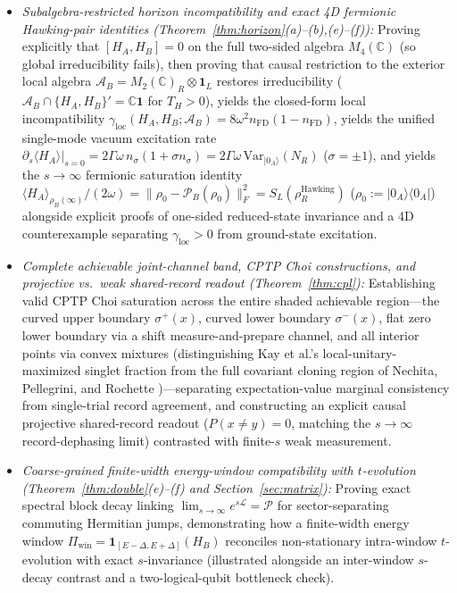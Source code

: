\documentclass[11pt,a4paper]{article}
\theoremstyle{definition}
\theoremstyle{remark}
\newcommand{\cA}{\mathcal{A}}
\newcommand{\cL}{\mathcal{L}}
\newcommand{\cP}{\mathcal{P}}
\newcommand{\bbC}{\mathbb{C}}
\newcommand{\1}{\mathbf{1}}
\newcommand{\normF}[1]{\|#1\|_F}
\begin{document}
\begin{enumerate}
\begin{itemize}
    \item \emph{Subalgebra-restricted horizon incompatibility and exact 4D fermionic Hawking-pair identities (Theorem~\ref{thm:horizon}(a)--(b),(e)--(f)):} Proving explicitly that $[H_A,H_B]=0$ on the full two-sided algebra $M_4(\bbC)$ (so global irreducibility fails), then proving that causal restriction to the exterior local algebra $\cA_B = M_2(\bbC)_R\otimes\1_L$ restores irreducibility ($\cA_B\cap\{H_A,H_B\}'=\bbC\1$ for $T_H>0$), yields the closed-form local incompatibility $\gamma_{\mathrm{loc}}(H_A,H_B;\cA_B) = \allowbreak 8\omega^2 n_{\mathrm{FD}}(1-n_{\mathrm{FD}})$, yields the unified single-mode vacuum excitation rate $\partial_s\langle H_A\rangle|_{s=0} = \allowbreak 2\Gamma\omega\,n_\sigma(1+\sigma n_\sigma) = \allowbreak 2\Gamma\omega\,\mathrm{Var}_{|0_A\rangle}(N_R)$ ($\sigma=\pm 1$), and yields the $s\to\infty$ fermionic saturation identity $\langle H_A\rangle_{\rho_B(\infty)}/(2\omega) = \allowbreak \normF{\rho_0 - \cP_B(\rho_0)}^2 = \allowbreak S_L(\rho_R^{\mathrm{Hawking}})$ ($\rho_0 := |0_A\rangle\langle 0_A|$) alongside explicit proofs of one-sided reduced-state invariance and a 4D counterexample separating $\gamma_{\mathrm{loc}}>0$ from ground-state excitation.
    \item \emph{Complete achievable joint-channel band, CPTP Choi constructions, and projective vs.\ weak shared-record readout (Theorem~\ref{thm:cpl}):} Establishing valid CPTP Choi saturation across the entire shaded achievable region---the curved upper boundary $\sigma^+(x)$, curved lower boundary $\sigma^-(x)$, flat zero lower boundary via a shift measure-and-prepare channel, and all interior points via convex mixtures (distinguishing Kay et al.'s local-unitary-maximized singlet fraction \cite{Kay2009} from the full covariant cloning region of Nechita, Pellegrini, and Rochette \cite{Nechita2021})---separating expectation-value marginal consistency from single-trial record agreement, and constructing an explicit causal projective shared-record readout ($P(x\neq y)=0$, matching the $s\to\infty$ record-dephasing limit) contrasted with finite-$s$ weak measurement.
    \item \emph{Coarse-grained finite-width energy-window compatibility with $t$-evolution (Theorem~\ref{thm:double}(e)--(f) and Section~\ref{sec:matrix}):} Proving exact spectral block decay linking $\lim_{s\to\infty} e^{s\cL} = \cP$ for sector-separating commuting Hermitian jumps, demonstrating how a finite-width energy window $\Pi_{\mathrm{win}}=\1_{[E-\Delta,E+\Delta]}(H_B)$ reconciles non-stationary intra-window $t$-evolution with exact $s$-invariance (illustrated alongside an inter-window $s$-decay contrast and a two-logical-qubit bottleneck check).

\end{itemize}
\end{enumerate}
\end{document}
